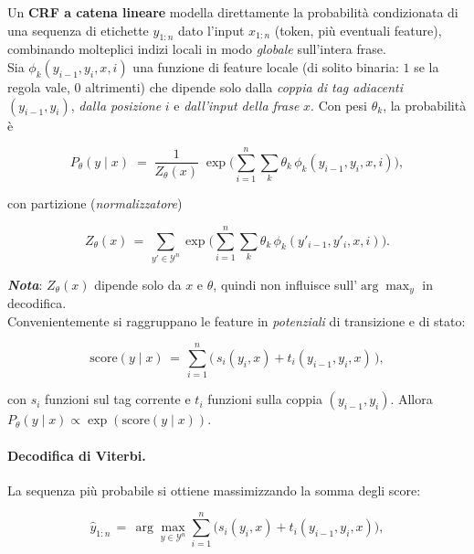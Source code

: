                 Un \textbf{CRF a catena lineare} modella direttamente la probabilità condizionata di una sequenza di etichette $y_{1:n}$ dato l’input $x_{1:n}$ (token, più eventuali feature), combinando molteplici indizi locali in modo \emph{globale} sull’intera frase.\\
                
                Sia $\phi_k(y_{i-1},y_i,x,i)$ una funzione di feature locale (di solito binaria: $1$ se la regola vale, $0$ altrimenti) che dipende solo dalla \textit{coppia di tag adiacenti} $(y_{i-1},y_i)$, \textit{dalla posizione} $i$ e \textit{dall’input della frase} $x$. Con pesi $\theta_k$, la probabilità è
                
                $$
                    P_\theta(y\mid x) 
                    \;=\; \frac{1}{Z_\theta(x)} \; \exp\!\Bigg(\sum_{i=1}^{n} \sum_{k} \theta_k\, \phi_k(y_{i-1},y_i,x,i)\Bigg),
                $$
                
                con partizione (\emph{normalizzatore})
                
                $$
                    Z_\theta(x) \,=\, \sum_{y'\in\mathcal{Y}^n} \exp\!\Bigg(\sum_{i=1}^{n} \sum_{k} \theta_k\, \phi_k(y'_{i-1},y'_i,x,i)\Bigg).
                $$
                
                \textbf{\textit{Nota}}: $Z_\theta(x)$ dipende solo da $x$ e $\theta$, quindi non influisce sull’$\arg\max_y$ in decodifica.\\
                
                Convenientemente si raggruppano le feature in \emph{potenziali} di transizione e di stato: 
                
                $$
                    \mathrm{score}(y\mid x) \,=\, \sum_{i=1}^{n} \big( \, s_i(y_i,x) + t_i(y_{i-1},y_i,x) \,\big),
                $$
                
                con $s_i$ funzioni sul tag corrente e $t_i$ funzioni sulla coppia $(y_{i-1},y_i)$. Allora $P_\theta(y\mid x) \propto \exp(\mathrm{score}(y\mid x))$.
                
                \paragraph{Decodifica di Viterbi.}
                La sequenza più probabile si ottiene massimizzando la somma degli score:
                
                $$
                    \hat y_{1:n} \,=\, \arg\max_{y\in\mathcal{Y}^n} \sum_{i=1}^{n} \big( s_i(y_i,x) + t_i(y_{i-1},y_i,x) \big),
                $$
                
